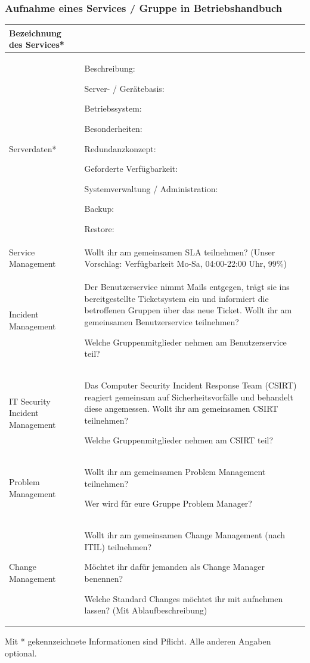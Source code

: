 \documentclass[]{article}
\begin{document}
\subsubsection{Aufnahme eines Services / Gruppe in
Betriebshandbuch}\label{aufnahme-eines-services-gruppe-in-betriebshandbuch}

\begin{longtable}{lp{8cm}}
\toprule
Bezeichnung des Services* &\tabularnewline
\midrule
Serverdaten* & Beschreibung: \bigskip

Server- / Gerätebasis: \bigskip

Betriebssystem: \bigskip

Besonderheiten: \bigskip

Redundanzkonzept: \bigskip

Geforderte Verfügbarkeit: \bigskip

Systemverwaltung / Administration: \bigskip

Backup: \bigskip

Restore:\tabularnewline
\midrule
Service Management & Wollt ihr am gemeinsamen SLA teilnehmen?
\bigskip
(Unser Vorschlag: Verfügbarkeit Mo-Sa, 04:00-22:00 Uhr,
99\%)\tabularnewline
\midrule
Incident Management & Der Benutzerservice nimmt Mails entgegen, trägt
sie ins bereitgestellte Ticketsystem ein und informiert die betroffenen
Gruppen über das neue Ticket. Wollt ihr am gemeinsamen Benutzerservice
teilnehmen?

\bigskip
Welche Gruppenmitglieder nehmen am Benutzerservice teil?
\tabularnewline
\midrule
IT Security Incident Management & Das Computer Security Incident
Response Team (CSIRT) reagiert gemeinsam auf Sicherheitsvorfälle und
behandelt diese angemessen. Wollt ihr am gemeinsamen CSIRT teilnehmen?

\bigskip
Welche Gruppenmitglieder nehmen am CSIRT teil?
\tabularnewline
\midrule
Problem Management & Wollt ihr am gemeinsamen Problem Management
teilnehmen?

\bigskip
Wer wird für eure Gruppe Problem Manager?\tabularnewline
Change Management & Wollt ihr am gemeinsamen Change Management (nach
ITIL) teilnehmen?

\bigskip
Möchtet ihr dafür jemanden als Change Manager benennen?

\bigskip
Welche Standard Changes möchtet ihr mit aufnehmen lassen? (Mit
Ablaufbeschreibung)

\bigskip
\tabularnewline
\bottomrule
\end{longtable}

Mit * gekennzeichnete Informationen sind Pflicht. Alle anderen Angaben
optional.
\end{document}
